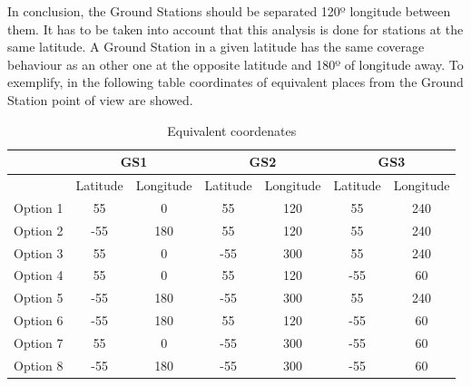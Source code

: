 In conclusion, the Ground Stations should be separated 120º longitude between them. It has to be taken into account that this analysis is done for stations at the same latitude. A Ground Station in a given latitude has the same coverage behaviour as an other one at the opposite latitude and 180º of longitude away. To exemplify, in the following table coordinates of equivalent places from the Ground Station point of view are showed. 
\begin{table}[H]
\begin{center}
\begin{tabular}{|c|c|c|c|c|c|c|}
\hline 
 & \multicolumn{2}{c|}{GS1} & \multicolumn{2}{c|}{GS2} & \multicolumn{2}{c|}{GS3} \\ 
\hline 
 & Latitude & Longitude & Latitude & Longitude & Latitude & Longitude \\ 
\hline 
Option 1 & 55 & 0 & 55 & 120 & 55 & 240 \\ 
\hline 
Option 2 & -55 & 180 & 55 & 120 & 55 & 240 \\ 
\hline 
Option 3 & 55 & 0 & -55 & 300 & 55 & 240 \\ 
\hline 
Option 4 & 55 & 0 & 55 & 120 & -55 & 60 \\ 
\hline 
Option 5 & -55 & 180 & -55 & 300 & 55 & 240 \\ 
\hline 
Option 6 & -55 & 180 & 55 & 120 & -55 & 60 \\ 
\hline 
Option 7 & 55 & 0 & -55 & 300 & -55 & 60 \\ 
\hline 
Option 8 & -55 & 180 & -55 & 300 & -55 & 60 \\ 
\hline 
\end{tabular}
\caption{Equivalent coordenates}
\end{center}
\end{table}